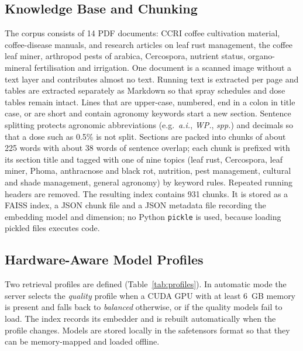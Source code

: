 \subsection{Knowledge Base and Chunking}
The corpus consists of 14 PDF documents: CCRI coffee cultivation material, coffee-disease manuals, and research articles
on leaf rust management, the coffee leaf miner, arthropod pests of arabica, Cercospora, nutrient status, organo-mineral
fertilisation and irrigation. One document is a scanned image without a text layer and contributes almost no text.
Running text is extracted per page and tables are extracted separately as Markdown so that spray schedules and dose
tables remain intact. Lines that are upper-case, numbered, end in a colon in title case, or are short and contain
agronomy keywords start a new section. Sentence splitting protects agronomic abbreviations (e.g.\ \textit{a.i.},
\textit{WP.}, \textit{spp.}) and decimals so that a dose such as 0.5\% is not split. Sections are packed into chunks of
about 225 words with about 38 words of sentence overlap; each chunk is prefixed with its section title and tagged with
one of nine topics (leaf rust, Cercospora, leaf miner, Phoma, anthracnose and black rot, nutrition, pest management,
cultural and shade management, general agronomy) by keyword rules. Repeated running headers are removed. The resulting
index contains 931 chunks. It is stored as a FAISS index, a JSON chunk file and a JSON metadata file recording the
embedding model and dimension; no Python \texttt{pickle} is used, because loading pickled files executes code.

\subsection{Hardware-Aware Model Profiles}
Two retrieval profiles are defined (Table~\ref{tab:profiles}). In automatic mode the server selects the \emph{quality}
profile when a CUDA GPU with at least 6~GB memory is present and falls back to \emph{balanced} otherwise, or if the
quality models fail to load. The index records its embedder and is rebuilt automatically when the profile changes.
Models are stored locally in the safetensors format so that they can be memory-mapped and loaded offline.

